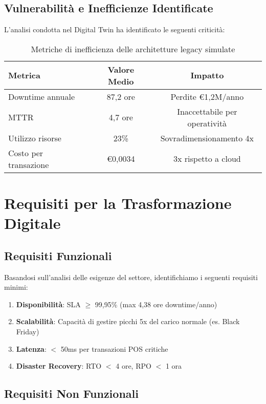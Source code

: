 \subsection{Vulnerabilità e Inefficienze Identificate}

L'analisi condotta nel Digital Twin ha identificato le seguenti criticità:

\begin{table}[h!]
\centering
\caption{Metriche di inefficienza delle architetture legacy simulate}
\begin{tabular}{|l|c|c|}
\hline
\textbf{Metrica} & \textbf{Valore Medio} & \textbf{Impatto} \\
\hline
Downtime annuale & 87,2 ore & Perdite €1,2M/anno \\
MTTR & 4,7 ore & Inaccettabile per operatività \\
Utilizzo risorse & 23\% & Sovradimensionamento 4x \\
Costo per transazione & €0,0034 & 3x rispetto a cloud \\
\hline
\end{tabular}
\end{table}

\section{Requisiti per la Trasformazione Digitale}

\subsection{Requisiti Funzionali}

Basandosi sull'analisi delle esigenze del settore, identifichiamo i seguenti requisiti minimi:

\begin{enumerate}
\item \textbf{Disponibilità}: SLA $\geq$ 99,95\% (max 4,38 ore downtime/anno)
\item \textbf{Scalabilità}: Capacità di gestire picchi 5x del carico normale (es. Black Friday)
\item \textbf{Latenza}: $<$ 50ms per transazioni POS critiche
\item \textbf{Disaster Recovery}: RTO $<$ 4 ore, RPO $<$ 1 ora
\end{enumerate}

\subsection{Requisiti Non Funzionali}

